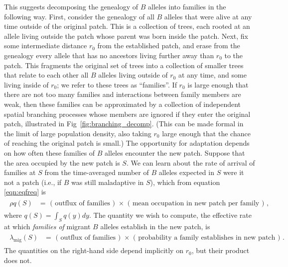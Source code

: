 \documentclass{article}
\newcommand{\migrate}{\lambda_\text{mig}}
\begin{document}
This suggests decomposing the genealogy of $B$ alleles into families in the following way.
First, consider the genealogy of all $B$ alleles that were alive at any time outside of the original patch.  
This is a collection of trees, each rooted at an allele living outside the patch whose parent was born inside the patch.
Next, fix some intermediate distance $r_0$ from the established patch,
and erase from the genealogy every allele that has no ancestors living further away than $r_0$ to the patch.
This fragments the original set of trees into a collection of smaller trees that relate to each other all $B$ alleles living outside of $r_0$ at any time,
and some living inside of $r_0$;
we refer to these trees as ``families''.
If $r_0$ is large enough that there are not too many families
and interactions between family members are weak,
then these families can be approximated 
by a collection of independent spatial branching processes
whose members are ignored if they enter the original patch,
illustrated in Fig~\ref{fig:branching_decomp}.
(This can be made formal in the limit of large population density, also taking $r_0$ large enough that the chance of reaching the original patch is small.)
The opportunity for adaptation depends on how often these families of $B$ alleles encounter the new patch.
Suppose that the area occupied by the new patch is $S$.
We can learn about the rate of arrival of families at $S$ from
the time-averaged number of $B$ alleles expected in $S$ were it not a patch
(i.e., if $B$ was still maladaptive in $S$),
which from equation \eqref{eqn:eqfreq}
is 
\begin{align}
    \label{eqn:gestalt_q}
    \begin{split}
        \rho q(S) &= \text{ ( outflux of families ) } \times \text{ ( mean occupation in new patch per family ) } ,
\end{split}
\end{align}
where $q(S) = \int_S q(y) dy$.
The quantity we wish to compute,
the effective rate at which \emph{families of} migrant $B$ alleles establish in the new patch,
is
\begin{align}
    \label{eqn:gestalt_migrate}
    \begin{split}
        \migrate(S) &= \text{ ( outflux of families ) } \times \text{ ( probability a family establishes in new patch ) } .
    \end{split}
\end{align}
The quantities on the right-hand side depend implicitly on $r_0$,
but their product does not.
\end{document}
